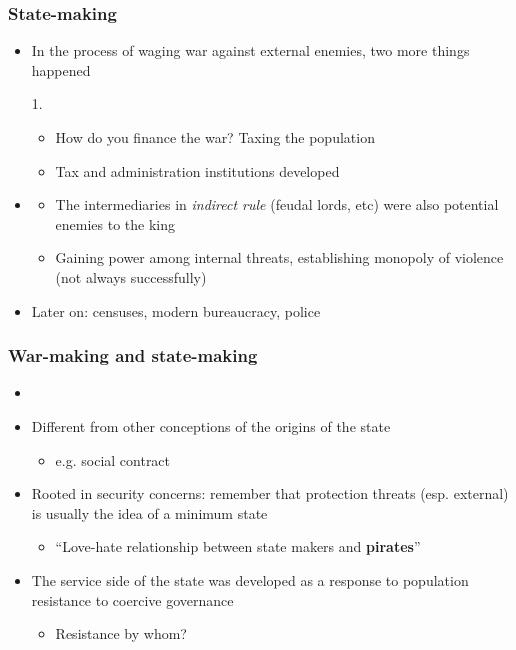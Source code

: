 \documentclass[aspectratio=43, handout]{beamer}
\begin{document}
\begin{frame}
\frametitle{State-making}
\centering

\begin{itemize}
\item In the process of waging war against external enemies, two more things happened
\item[1.] 
  \begin{itemize}
    \item How do you finance the war? Taxing the population
    \item Tax and administration institutions developed
  \end{itemize}
\item<2->[2.] 
\begin{itemize}
  \item The intermediaries in \textit{indirect rule} (feudal lords, etc) were also potential enemies to the king
  \item Gaining power among internal threats, establishing monopoly of violence (not always successfully)
\end{itemize}
\item<3-> Later on: censuses, modern bureaucracy, police
\end{itemize}

\end{frame}

\begin{frame}
\frametitle{War-making and state-making}
\centering

\begin{itemize}
\item {}
\item[]
\item<2-> Different from other conceptions of the origins of the state
\begin{itemize}
  \item e.g. social contract
\end{itemize}
\item<2-> Rooted in security concerns: remember that protection threats (esp. external) is usually the idea of a minimum state
\begin{itemize}
  \item ``Love-hate relationship between state makers and \textbf{pirates}''
\end{itemize}
\item<2-> The service side of the state was developed as a response to population resistance to coercive governance
\begin{itemize}
  \item Resistance by whom?
\end{itemize}
\end{itemize}

\end{frame}
\end{document}
